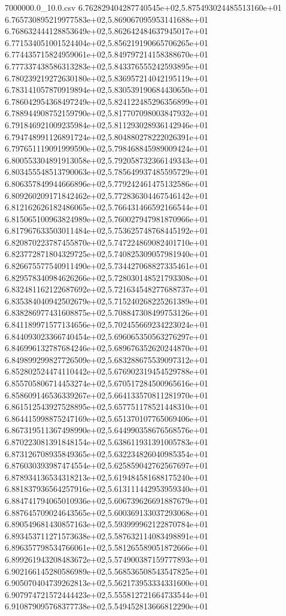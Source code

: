 \begin{filecontents*}{7000000.0_10.0.csv}
6.762829404287740545e+02,5.875493024485513160e+01
6.765730895219977583e+02,5.869067095953141688e+01
6.768632444128853649e+02,5.862642484637945017e+01
6.771534051001524404e+02,5.856219190665706265e+01
6.774435715824959061e+02,5.849797214158388670e+01
6.777337438586313283e+02,5.843376555242593895e+01
6.780239219272630180e+02,5.836957214042195119e+01
6.783141057870919894e+02,5.830539190684430650e+01
6.786042954368497249e+02,5.824122485296356899e+01
6.788944908752159790e+02,5.817707098003847932e+01
6.791846921009235984e+02,5.811293028936142946e+01
6.794748991126891724e+02,5.804880278222026391e+01
6.797651119091999590e+02,5.798468845989009424e+01
6.800553304891913058e+02,5.792058732366149343e+01
6.803455548513790063e+02,5.785649937485595729e+01
6.806357849944666896e+02,5.779242461475132586e+01
6.809260209171842462e+02,5.772836304467546142e+01
6.812162626182486065e+02,5.766431466592166544e+01
6.815065100963824989e+02,5.760027947981870966e+01
6.817967633503011484e+02,5.753625748768445192e+01
6.820870223787455870e+02,5.747224869082401710e+01
6.823772871804329725e+02,5.740825309057981940e+01
6.826675577540911490e+02,5.734427068827335461e+01
6.829578340984626266e+02,5.728030148521793308e+01
6.832481162122687692e+02,5.721634548277688737e+01
6.835384040942502679e+02,5.715240268225261389e+01
6.838286977431608875e+02,5.708847308499753126e+01
6.841189971577134656e+02,5.702455669234223024e+01
6.844093023366740454e+02,5.696065350563276297e+01
6.846996132787684246e+02,5.689676352620244870e+01
6.849899299827726509e+02,5.683288675539097312e+01
6.852802524474110442e+02,5.676902319454529788e+01
6.855705806714453274e+02,5.670517284500965616e+01
6.858609146536339267e+02,5.664133570811281970e+01
6.861512543927528895e+02,5.657751178521448310e+01
6.864415998875247169e+02,5.651370107765069406e+01
6.867319511367498990e+02,5.644990358676568576e+01
6.870223081391848154e+02,5.638611931391005783e+01
6.873126708935849365e+02,5.632234826040985354e+01
6.876030393987474554e+02,5.625859042762567697e+01
6.878934136534318213e+02,5.619484581688175240e+01
6.881837936564257916e+02,5.613111442953959340e+01
6.884741794065010936e+02,5.606739626691887679e+01
6.887645709024643565e+02,5.600369133037293068e+01
6.890549681430857163e+02,5.593999962122870784e+01
6.893453711271573638e+02,5.587632114083498891e+01
6.896357798534766061e+02,5.581265589051872666e+01
6.899261943208483672e+02,5.574900387159777893e+01
6.902166145280586989e+02,5.568536508543547825e+01
6.905070404739262813e+02,5.562173953334331600e+01
6.907974721572444423e+02,5.555812721664733544e+01
6.910879095768377738e+02,5.549452813666812290e+01

\end{filecontents*}
